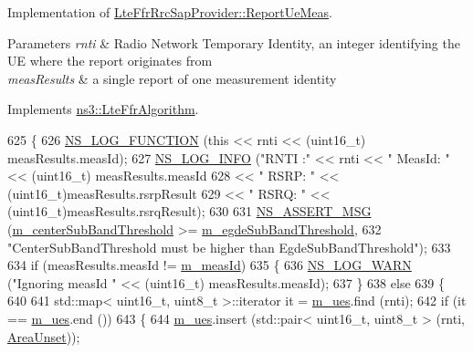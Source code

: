 Implementation of \hyperlink{classns3_1_1LteFfrRrcSapProvider_aefa0779641b8432a7d3406b519ca7e59}{Lte\+Ffr\+Rrc\+Sap\+Provider\+::\+Report\+Ue\+Meas}. 


\begin{DoxyParams}{Parameters}
{\em rnti} & Radio Network Temporary Identity, an integer identifying the UE where the report originates from \\
\hline
{\em meas\+Results} & a single report of one measurement identity \\
\hline
\end{DoxyParams}


Implements \hyperlink{classns3_1_1LteFfrAlgorithm_aae66b1b7edbacf07b96e171d89de3f91}{ns3\+::\+Lte\+Ffr\+Algorithm}.


\begin{DoxyCode}
625 \{
626   \hyperlink{log-macros-disabled_8h_a90b90d5bad1f39cb1b64923ea94c0761}{NS\_LOG\_FUNCTION} (\textcolor{keyword}{this} << rnti << (uint16\_t) measResults.measId);
627   \hyperlink{group__logging_gafbd73ee2cf9f26b319f49086d8e860fb}{NS\_LOG\_INFO} (\textcolor{stringliteral}{"RNTI :"} << rnti << \textcolor{stringliteral}{" MeasId: "} << (uint16\_t) measResults.measId
628                         << \textcolor{stringliteral}{" RSRP: "} << (uint16\_t)measResults.rsrpResult
629                         << \textcolor{stringliteral}{" RSRQ: "} << (uint16\_t)measResults.rsrqResult);
630 
631   \hyperlink{assert_8h_aff5ece9066c74e681e74999856f08539}{NS\_ASSERT\_MSG} (\hyperlink{classns3_1_1LteFfrSoftAlgorithm_ac4ac7ef3bbd34f07e389f27acd3b688a}{m\_centerSubBandThreshold} >= 
      \hyperlink{classns3_1_1LteFfrSoftAlgorithm_a57371c026141c475aa45dac00ea08c1c}{m\_egdeSubBandThreshold},
632                  \textcolor{stringliteral}{"CenterSubBandThreshold must be higher than EgdeSubBandThreshold"});
633 
634   \textcolor{keywordflow}{if} (measResults.measId != \hyperlink{classns3_1_1LteFfrSoftAlgorithm_ac5cb7929c100c0b2ed88f67113ddd6b9}{m\_measId})
635     \{
636       \hyperlink{group__logging_gade7208b4009cdf0e25783cd26766f559}{NS\_LOG\_WARN} (\textcolor{stringliteral}{"Ignoring measId "} << (uint16\_t) measResults.measId);
637     \}
638   \textcolor{keywordflow}{else}
639     \{
640 
641       std::map< uint16\_t, uint8\_t >::iterator it = \hyperlink{classns3_1_1LteFfrSoftAlgorithm_ad91e051d77e6fda38a1429ac2dd0fc3b}{m\_ues}.find (rnti);
642       \textcolor{keywordflow}{if} (it == \hyperlink{classns3_1_1LteFfrSoftAlgorithm_ad91e051d77e6fda38a1429ac2dd0fc3b}{m\_ues}.end ())
643         \{
644           \hyperlink{classns3_1_1LteFfrSoftAlgorithm_ad91e051d77e6fda38a1429ac2dd0fc3b}{m\_ues}.insert (std::pair< uint16\_t, uint8\_t > (rnti, \hyperlink{classns3_1_1LteFfrSoftAlgorithm_ab7465e8060d14e4f9e298b06c9ba372ca97ba8e00159d25b2bfc08bf2fd5926c8}{AreaUnset}));

\end{DoxyCode}

